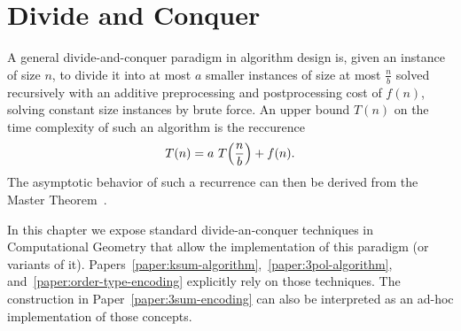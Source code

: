\chapter{\done Divide and Conquer}

A general divide-and-conquer paradigm in algorithm design is,
given an instance of size \(n\), to divide it into at most
\(a\) smaller instances of size at most \(\frac{n}{b}\) solved recursively
with an additive preprocessing and postprocessing cost of \(f(n)\), solving
constant size instances by brute force.
%
An upper bound \(T(n)\) on the time complexity of such an algorithm is the
reccurence
\begin{displaymath}
	T(n) = a \,\, T\mleft(\frac nb\mright) + f(n).
\end{displaymath}
%
The asymptotic behavior of such a recurrence can then be derived from the
Master Theorem~\cite{BHS80,CLRS09}.

In this chapter we expose standard divide-an-conquer techniques in
Computational Geometry that allow the implementation of this paradigm (or
variants of it).
%
Papers~\ref{paper:ksum-algorithm},~\ref{paper:3pol-algorithm},
and~\ref{paper:order-type-encoding} explicitly rely on those techniques.
%
The construction in
Paper~\ref{paper:3sum-encoding} can also be interpreted as an ad-hoc
implementation of those concepts.




